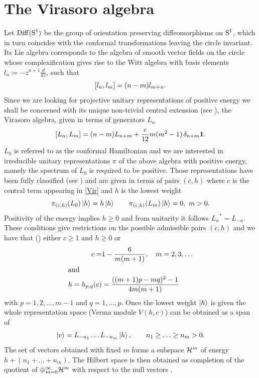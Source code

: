 \section{The Virasoro algebra}
\label{The Virasoro algebra}
Let $\operatorname{Diff}(\textrm{S}^1)$ be the group of orientation preserving
diffeomorphisms on $\textrm{S}^1$, which in turn coincides with
the conformal transformations leaving the circle invariant. 
Its Lie algebra corresponds to the algebra of smooth
vector fields on the circle whose complexification gives 
rise to the Witt algebra with basis elements $l_n\coloneqq
-z^{n+1} \frac{d}{dz}$, such that
\[
[l_n,l_m]=(n-m)l_{m+n}.
\]
Since we are looking for projective unitary representations of
positive energy we shall be concerned with its unique non-trivial 
central extension (see \cite*{KE:1998}), the Virasoro algebra, 
given in terms of generators $L_n$
\begin{equation}
\label{Vir}
[L_n,L_m]=(n-m)L_{n+m} + \frac{c}{12} m(m^2-1)\,
\delta_{n+m}\bm{1}.
\end{equation}
$L_0$ is referred to as the conformal Hamiltonian and we are interested
in irreducible unitary representations $\pi$ of the above algebra with 
positive energy, namely the spectrum of $L_0$ is required to be positive.
Those representations have been fully classified (see \cite*{FQS})
and are given in terms of pairs $(c,h)$ where $c$ is the central
term appearing in \eqref{Vir} and $h$ is the lowest weight
\[
\pi_{(c,h)}(L_0)\ket{h}=h\ket{h}\qquad \pi_{(c,h)}(L_m)\ket{h}=0,\ m>0.
\]
Positivity of the energy implies $h\geq 0$ and from unitarity it follows
${L_n}^*=L_{-n}$. These conditions give restrictions on the possible
admissible pairs $(c,h)$ and we have that (\cite*{FQS:1984}) either 
$c\geq 1\text{ and }h\geq 0$ or 
\begin{align*}
c=&1-\frac{6}{m(m+1)},\quad m=2,3,\ldots\\ 
\intertext{and}
h=h_{p,q}(c)&=\frac{((m+1)p-mq)^2-1}{4m(m+1)}
\end{align*}
with $p=1,2,\ldots,m-1$ and $q=1,\ldots,p$. Once the lowest weight 
$\ket{h}$ is given the whole representation space (Verma module 
$V(h,c)$) can be obtained as a span of 
\[
\ket{v}=L_{-n_1}\ldots L_{-n_m}\ket{h},\qquad n_1\geq 
\ldots \geq n_m > 0.
\]
The set of vectors obtained with fixed $m$ forms a subspace ${\mathcal{H}}^m$
of energy $h+(n_1+\ldots +n_m)$. The Hilbert space is then obtained as
completion of the quotient of $\oplus_{m=0}^{\infty}{\mathcal{H}}^m$ 
with respect to the null vectors \cite*{KE:1998}.



